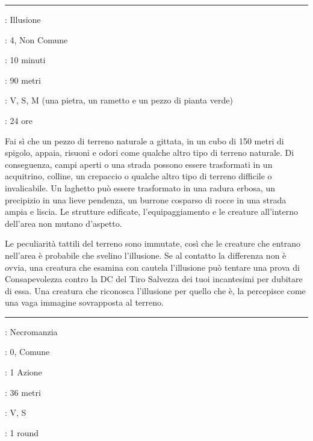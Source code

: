 \begin{multicols}{2}
\smallskip\noindent\rule{\linewidth}{2pt} \hypertarget{Terreno Illusorio}{}\smallskip{}
\noindent
\begin{description}[noitemsep, topsep=0pt, parsep=0pt, partopsep=0pt, leftmargin=0cm, labelwidth=2.8cm]
	\item[\textbf{Lista di Magia}]: Illusione
	\item[\textbf{Livello}]: 4, Non Comune
	\item[\textbf{T. di Lancio}]: 10 minuti
	\item[\textbf{Gittata}]: 90 metri
	\item[\textbf{Componenti}]: V, S, M (una pietra, un rametto e un pezzo di pianta verde)
	\item[\textbf{Durata}]: 24 ore
\end{description}

Fai sì che un pezzo di terreno naturale a gittata, in un cubo di 150 metri di spigolo, appaia, risuoni e odori come qualche altro tipo di terreno naturale. Di conseguenza, campi aperti o una strada possono essere trasformati in un acquitrino, colline, un crepaccio o qualche altro tipo di terreno difficile o invalicabile. Un laghetto può essere trasformato in una radura erbosa, un precipizio in una lieve pendenza, un burrone cosparso di rocce in una strada ampia e liscia. Le strutture edificate, l'equipaggiamento e le creature all'interno dell'area non mutano d'aspetto.

Le peculiarità tattili del terreno sono immutate, così che le creature che entrano nell'area è probabile che svelino l'illusione. Se al contatto la differenza non è ovvia, una creatura che esamina con cautela l'illusione può tentare una prova di Consapevolezza contro la DC del Tiro Salvezza dei tuoi incantesimi per dubitare di essa. Una creatura che riconosca l'illusione per quello che è, la percepisce come una vaga immagine sovrapposta al terreno.

\smallskip\noindent\rule{\linewidth}{2pt} \hypertarget{Tocco Gelido}{}\smallskip{}
\noindent
\begin{description}[noitemsep, topsep=0pt, parsep=0pt, partopsep=0pt, leftmargin=0cm, labelwidth=2.8cm]
	\item[\textbf{Lista di Magia}]: Necromanzia
	\item[\textbf{Livello}]: 0, Comune
	\item[\textbf{T. di Lancio}]: 1 Azione
	\item[\textbf{Gittata}]: 36 metri
	\item[\textbf{Componenti}]: V, S
	\item[\textbf{Durata}]: 1 round
\end{description}


\end{multicols}
